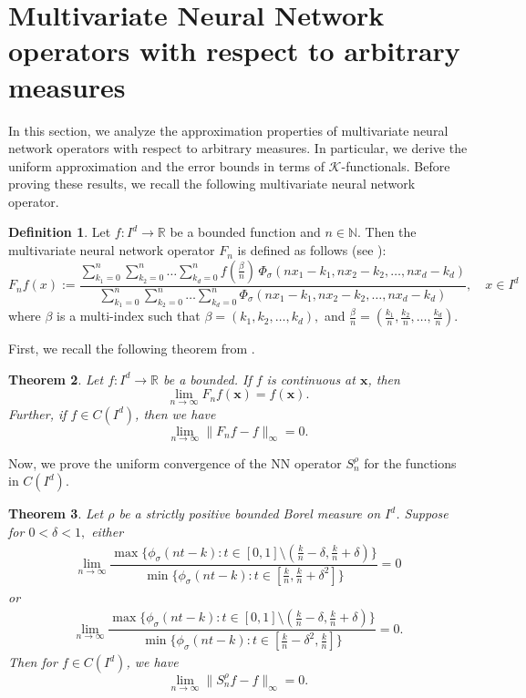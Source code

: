 \documentclass[12pt, reqno]{amsart}
\numberwithin{equation}{section}
\newtheorem{theorem}{Theorem}[section]
\theoremstyle{definition}
\newtheorem{definition}[theorem]{Definition}
\theoremstyle{remark}
\numberwithin{equation}{section}
\newcommand{\R}{\mathbb{R}}
\newcommand{\N}{\mathbb{N}}
\newcommand{\X}{\mathbf{x}}
\begin{document}
\section{Multivariate Neural Network operators with respect to arbitrary measures} \label{multi}
In this section, we analyze the approximation properties of multivariate neural network operators with respect to arbitrary measures. In particular, we derive the uniform approximation and the error bounds in terms of $\mathcal{K}$-functionals. Before proving these results, we recall the following multivariate neural network operator.
\begin{definition}
Let $f:I^d\to\R$ be a bounded function and $n\in\N$. Then the multivariate neural network operator $F_n$ is defined as follows (see \cite{Costar2}):
$$F_nf(x):=\displaystyle{\dfrac{\sum_{k_1=0}^n\sum_{k_2=0}^n\ldots\sum_{k_d=0}^n f\left(\frac{\beta}{n}\right)\,\Phi_\sigma(nx_1-k_1,nx_2-k_2,\ldots,nx_d-k_d)}{\sum_{k_1=0}^n\sum_{k_2=0}^n\ldots\sum_{k_d=0}^n\Phi_\sigma(nx_1-k_1,nx_2-k_2,\ldots,nx_d-k_d)}},\quad x\in I^d$$
 where $\beta$ is a multi-index such that $\beta=(k_1,k_2,\ldots,k_d),$ and $\frac{\beta}{n}=\left(\frac{k_1}{n}, \frac{k_2}{n},\ldots,\frac{k_d}{n}\right)$. \end{definition}
First, we recall the following theorem from \cite{Costar2}.
\begin{theorem} \label{muni}
    Let $f:I^d\to\R$ be a bounded. If $f$ is continuous at $\X$, then $$\lim_{n\to\infty}
    F_nf(\X)=f(\X).$$ Further, if $f\in C(I^d)$, then we have
    $$\lim_{n\to\infty}\|F_nf-f\|_{\infty}=0.$$
\end{theorem}



 Now, we prove the uniform convergence of the NN operator $S_n^\rho$ for the functions in $C(I^d)$.
\begin{theorem} \label{munifo}
Let $\rho$ be a strictly positive bounded Borel measure on $I^d$. Suppose for $0<\delta<1,$ either
\begin{align}\lim_{n\rightarrow \infty} \dfrac{\max\{\phi_\sigma(nt-k): t\in [0,1]\setminus (\frac{k}{n}-\delta, \frac{k}{n}+\delta) \}}{\min\{\phi_\sigma(nt-k): t\in[\frac{k}{n}, \frac{k}{n}+\delta^2]\}}=0  \end{align} or 
\begin{align}\lim_{n\rightarrow \infty} \dfrac{\max\{\phi_\sigma(nt-k): t\in  [0,1]\setminus (\frac{k}{n}-\delta, \frac{k}{n}+\delta)\}}{\min\{\phi_\sigma(nt-k): t\in[\frac{k}{n}-\delta^2, \frac{k}{n}]\}}=0. \end{align}
 Then for $f\in C(I^d)$, we have $$\lim_{n\to\infty}\|S^{\rho}_nf-f\|_{\infty}=0.$$
\end{theorem}
\end{document}
